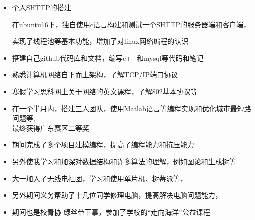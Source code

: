 \documentclass{resume}
\begin{document}
\begin{onehalfspacing}
\begin{itemize}
  \item 个人SHTTP的搭建
  
  在ubuntu16下，独自使用c语言构建和测试一个SHTTP的服务器端和客户端，
  
  实现了线程池等基本功能，增加了对linux网络编程的认识
  \item 搭建自己github代码库和文档，编写c++和mysql等代码和笔记
  \item 熟悉计算机网络自下而上架构，了解TCP/IP端口协议
  \item 寒假学习思科网上关于网络的英文课程，了解802基本协议等
  
\end{itemize}

\begin{onehalfspacing}
\begin{itemize}
  \item 在一个半月内，搭建三人团队，使用Matlab语言等编程实现和优化城市最短路问题等,\\最终获得广东赛区二等奖
  \item 期间完成了多个项目建模编程，提高了编程能力和抗压能力
  \item 另外使我学习和加深对数据结构和许多算法的理解，例如图论和生成树等
\end{itemize}
\end{onehalfspacing}
\begin{itemize}
  \item 大一加入了无线电社团，学习和使用单片机、树莓派等，
  \item 另外期间义务帮助了十几位同学修理电脑，提高解决电脑问题能力，
  \item 期间也是校青协-绿丝带干事，参加了学校的“走向海洋”公益课程
\end{itemize}



\end{onehalfspacing}

\end{document}

